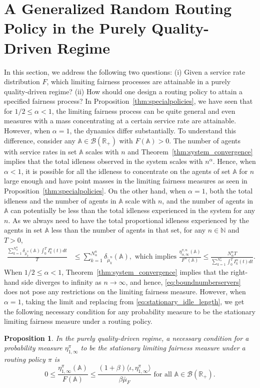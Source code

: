 \documentclass[a4paper,11pt,twoside]{article}
\numberwithin{equation}{section}
\numberwithin{figure}{section}
\theoremstyle{plain}
\newtheorem{proposition}[theorem]{Proposition}
\newcommand{\cB}{\mathcal{B}}
\newcommand{\AAA}{\mathbb{A}}
\newcommand{\NN}{\mathbb{N}}
\newcommand{\RR}{\mathbb{R}}
\newcommand{\1}{\mathbbm{1}}
\begin{document}
\section{A Generalized Random Routing Policy in the Purely Quality-Driven Regime}
\label{sec:grr_policy}
In this section, we address the following two questions: (i) Given a service rate distribution $F$, which limiting fairness processes are attainable in a purely quality-driven regime? (ii) How should one design a routing policy to attain a specified fairness process? In Proposition~\ref{thm:specialpolicies}, we have seen that for $1/2\leq \alpha <1$, the limiting fairness process can be quite general and even measures with a mass concentrating at a certain service rate are attainable. However, when $\alpha=1$, the dynamics differ substantially. To understand this difference, consider any $\AAA\in\cB(\RR_+)$ with $F(\AAA)>0$. The number of agents with service rates in set $\AAA$ scales with $n$ and Theorem~\ref{thm:system_convergence} implies that the total idleness observed in the system scales with $n^\alpha$. Hence, when $\alpha<1$, it is possible for all the idleness to concentrate on the agents of set $\AAA$ for $n$ large enough and have point masses in the limiting fairness measures as seen in Proposition~\ref{thm:specialpolicies}. On the other hand, when $\alpha=1$, both the total idleness and the number of agents in $\AAA$ scale with $n$, and the number of agents in $\AAA$ can potentially be less than the total idleness experienced in the system for any $n$. As we always need to have the total proportional idleness experienced by the agents in set $\AAA$ less than the number of agents in that set, for any $n\in \NN$ and $T>0$, 
\begin{align}
    \frac{\sum_{k=1}^{N_\alpha^n}\delta_{\tilde{\mu}_k^n}(\AAA)\int_0^T I_k^n(t)dt}{T}&\leq \sum_{k=1}^{N_\alpha^n}\delta_{\tilde{\mu}_k^n}(\AAA),
     \mbox{ which implies } 
    \frac{\eta_{\alpha,\infty}^{\pi,n}(\AAA)}{F^n(\AAA)}\leq \frac{N_\alpha^n T}{\sum_{k=1}^{N_\alpha^n}\int_0^TI_k^n(t)dt}.\label{eq:boundnumberservers}
\end{align}
When $1/2\leq \alpha<1$, Theorem~\ref{thm:system_convergence} implies that the right-hand side diverges to infinity as $n\to\infty$, and hence, \eqref{eq:boundnumberservers} does not pose any restrictions on the limiting fairness measure.  However, when $\alpha=1$, taking the limit and replacing from \eqref{eq:stationary_idle_length}, we get the following necessary condition for any probability measure to be the stationary limiting fairness measure under a routing policy.
\begin{proposition}\label{thm:necessary_idleness_distribution}
In the purely quality-driven regime, a necessary condition for  a probability measure $\eta_{1,\infty}^\pi$ to be the stationary limiting fairness measure under a routing policy $\pi$ is  
\begin{equation}
    0\leq \frac{\eta_{1,\infty}^\pi(\AAA)}{F(\AAA)}\leq \frac{(1+\beta)\langle \iota, \eta_{1,\infty}^\pi\rangle}{\beta \bar{\mu}_F} \mbox{ for all }\AAA\in \cB(\RR_+).\label{eq:boundqdregime}
\end{equation}
\end{proposition}
\end{document}
